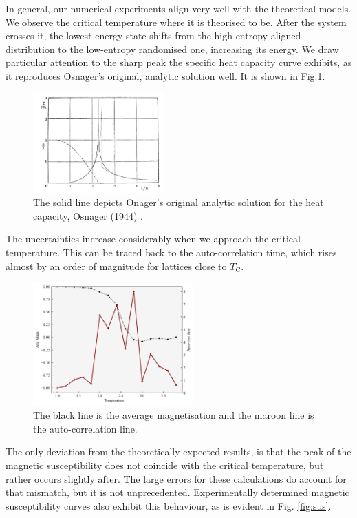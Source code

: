 \documentclass{IAYCPro}
\begin{document}
In general, our numerical experiments align very well with the theoretical models. We observe the critical temperature where it is theorised to be. After the system crosses it, the lowest-energy state shifts from the high-entropy aligned distribution to the low-entropy randomised one, increasing its energy. We draw particular attention to the sharp peak the specific heat capacity curve exhibits, as it reproduces Osnager's original, analytic solution well. It is shown in Fig.\ref{fig:osnager}.

\begin{figure}[H]
    \centering
    \includegraphics[width=0.45\textwidth]{figs/osnager.png}
    \caption{The solid line depicts Onager's original analytic solution for the heat capacity, Osnager (1944) \cite{Onsager}. }
    \label{fig:osnager}
\end{figure}

The uncertainties increase considerably when we approach the critical temperature. This can be traced back to the auto-correlation time, which rises almost by an order of magnitude for lattices close to $T_\mathrm{C}$.

\begin{figure}[H]
    \centering
    \includegraphics[width=0.55\textwidth]{figs/autocorr.png}
    \caption{The black line is the average magnetisation and the maroon line is the auto-correlation line.}
    \label{fig:enter-label}
\end{figure}

The only deviation from the theoretically expected results, is that the peak of the magnetic susceptibility does not coincide with the critical temperature, but rather occurs slightly after. The large errors for these calculations do account for that mismatch, but it is not unprecedented. Experimentally determined magnetic susceptibility curves also exhibit this behaviour, as is evident in Fig. \ref{fig:sus}.
\end{document}
